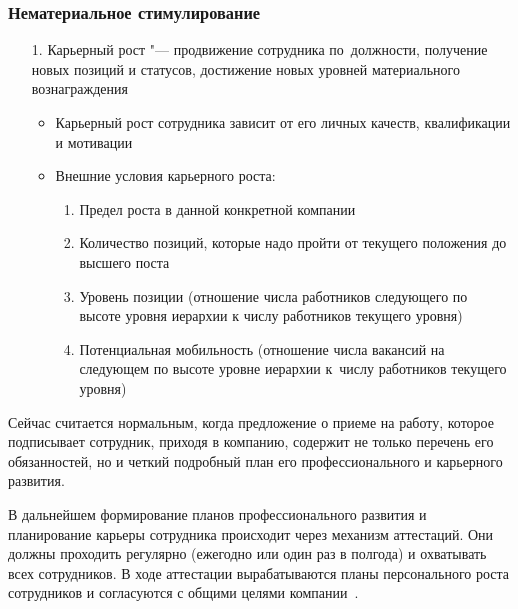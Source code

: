 \documentclass{../industrial-development}
\begin{document}
\begin{frame} \frametitle{Нематериальное стимулирование}
				  \begin{itemize}
						\item[1.] \alert{Карьерный рост} "--- продвижение сотрудника по~должности, получение новых позиций и статусов, достижение новых уровней материального вознаграждения
			  \begin{itemize}
					
					\item Карьерный рост сотрудника зависит от его личных качеств, квалификации и мотивации
				\item Внешние условия карьерного роста:
				 \begin{enumerate}
				\item Предел роста в данной конкретной компании
				\item Количество позиций, которые надо пройти от текущего положения до высшего поста
				\item Уровень позиции (отношение числа работников следующего по высоте уровня иерархии к числу работников текущего уровня)
				\item Потенциальная мобильность (отношение числа вакансий на следующем по высоте уровне иерархии к~числу работников текущего уровня)
				 \end{enumerate}

			 \end{itemize}
			
		
	  \end{itemize}
\end{frame}

\lecturenotes

Сейчас считается нормальным, когда предложение о приеме на работу, которое подписывает сотрудник, приходя в компанию, содержит не только перечень его обязанностей, но и четкий подробный план его профессионального и карьерного развития.

В дальнейшем формирование планов профессионального развития и планирование карьеры сотрудника происходит через механизм аттестаций. Они должны проходить регулярно (ежегодно или один раз в полгода) и охватывать всех сотрудников. В ходе аттестации вырабатываются планы персонального роста сотрудников и согласуются с общими целями компании~\cite{TriKitMotiv}.


\end{document}
